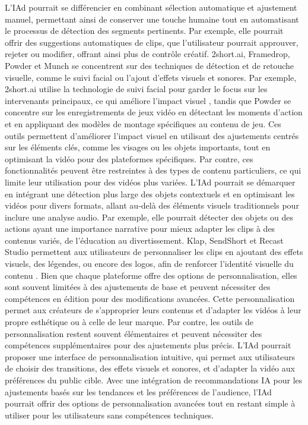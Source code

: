 \documentclass[livre]{udes-genie-these}
\begin{document}
L'IAd pourrait se différencier en combinant sélection automatique et ajustement manuel, permettant ainsi de conserver une touche humaine tout en automatisant le processus de détection des segments pertinents. Par exemple, elle pourrait offrir des suggestions automatiques de clips, que l'utilisateur pourrait approuver, rejeter ou modifier, offrant ainsi plus de contrôle créatif.
2short.ai, Framedrop, Powder et Munch se concentrent sur des techniques de détection et de retouche visuelle, comme le suivi facial ou l'ajout d'effets visuels et sonores. Par exemple, 2short.ai utilise la technologie de suivi facial pour garder le focus sur les intervenants principaux, ce qui améliore l'impact visuel \cite{short2024}, tandis que Powder \cite{powder2024} se concentre sur les enregistrements de jeux vidéo en détectant les moments d'action et en appliquant des modèles de montage spécifiques au contenu de jeu. Ces outils permettent d'améliorer l'impact visuel en utilisant des ajustements centrés sur les éléments clés, comme les visages ou les objets importants, tout en optimisant la vidéo pour des plateformes spécifiques. Par contre, ces fonctionnalités peuvent être restreintes à des types de contenu particuliers, ce qui limite leur utilisation pour des vidéos plus variées.
L'IAd pourrait se démarquer en intégrant une détection plus large des objets contextuels et en optimisant les vidéos pour divers formats, allant au-delà des éléments visuels traditionnels pour inclure une analyse audio. Par exemple, elle pourrait détecter des objets ou des actions ayant une importance narrative pour mieux adapter les clips à des contenus variés, de l'éducation au divertissement.
Klap, SendShort et Recast Studio permettent aux utilisateurs de personnaliser les clips en ajoutant des effets visuels, des légendes, ou encore des logos, afin de renforcer l'identité visuelle du contenu \cite{klap2024}\cite{sendshort2024}\cite{recast2024}. Bien que chaque plateforme offre des options de personnalisation, elles sont souvent limitées à des ajustements de base et peuvent nécessiter des compétences en édition pour des modifications avancées. Cette personnalisation permet aux créateurs de s'approprier leurs contenus et d'adapter les vidéos à leur propre esthétique ou à celle de leur marque. Par contre, les outils de personnalisation restent souvent élémentaires et peuvent nécessiter des compétences supplémentaires pour des ajustements plus précis.
L'IAd pourrait proposer une interface de personnalisation intuitive, qui permet aux utilisateurs de choisir des transitions, des effets visuels et sonores, et d'adapter la vidéo aux préférences du public cible. Avec une intégration de recommandations IA pour les ajustements basés sur les tendances et les préférences de l'audience, l'IAd pourrait offrir des options de personnalisation avancées tout en restant simple à utiliser pour les utilisateurs sans compétences techniques.
\end{document}
